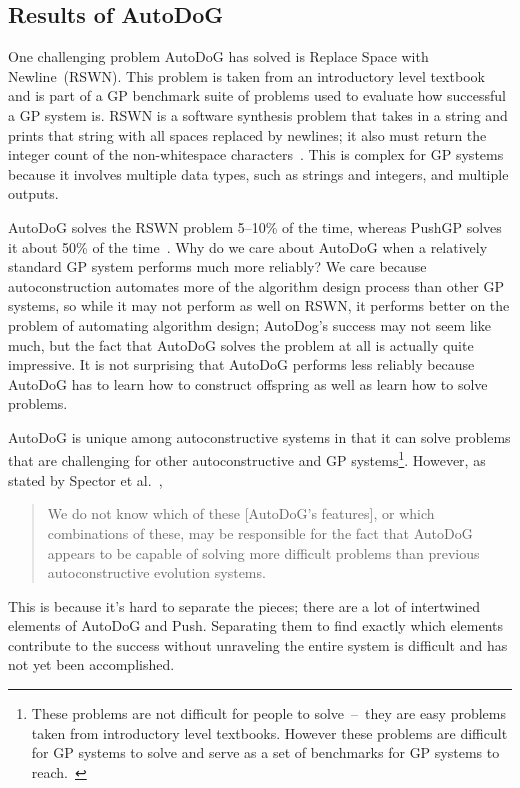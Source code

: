 \documentclass{sig-alternate}
\begin{document}
\subsection{Results of AutoDoG}
\label{sec:results}

One challenging problem AutoDoG has solved is Replace Space with Newline~(RSWN). This problem is taken from an introductory level textbook and is part of a GP benchmark suite of problems used to evaluate how successful a GP system is. RSWN is a software synthesis problem that takes in a string and prints that string with all spaces replaced by newlines; it also must return the integer count of the non-whitespace characters~\cite{helmuth:2015}. This is complex for GP systems because it involves multiple data types, such as strings and integers, and multiple outputs.

AutoDoG solves the RSWN problem 5--10\% of the time, whereas PushGP solves it about 50\% of the time~\cite{helmuth:2015}. Why do we care about AutoDoG when a relatively standard GP system performs much more reliably? We care because autoconstruction automates more of the algorithm design process than other GP systems, so while it may not perform as well on RSWN, it performs better on the problem of automating algorithm design; AutoDog's success may not seem like much, but the fact that AutoDoG solves the problem at all is actually quite impressive. It is not surprising that AutoDoG performs less reliably because AutoDoG has to learn how to construct offspring as well as learn how to solve problems.

AutoDoG is unique among autoconstructive systems in that it can solve problems that are challenging for other autoconstructive and GP systems\footnote{These problems are not difficult for people to solve~--~they are easy problems taken from introductory level textbooks. However these problems are difficult for GP systems to solve and serve as a set of benchmarks for GP systems to reach.~\cite{helmuth:2015}}. However, as stated by Spector et al.~\cite{spector:2016},
\begin{quotation}
	We do not know which of these [AutoDoG's features], or which combinations of these, may be responsible for the fact that AutoDoG appears to be capable of solving more difficult problems than previous autoconstructive evolution systems.
\end{quotation}
This is because it's hard to separate the pieces; there are a lot of intertwined elements of AutoDoG and Push. Separating them to find exactly which elements contribute to the success without unraveling the entire system is difficult and has not yet been accomplished.
\end{document}
